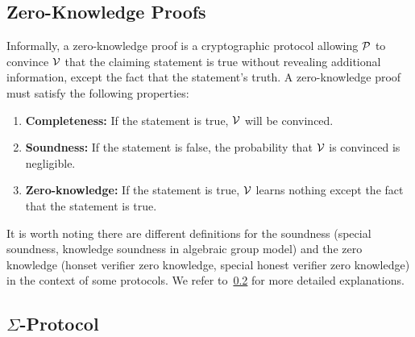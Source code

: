 \subsection{Zero-Knowledge Proofs}
Informally, a zero-knowledge proof is a cryptographic protocol allowing $\mathcal{P}$ to convince $\mathcal{V}$ that the claiming statement is true without revealing additional information, except the fact that the statement's truth. A zero-knowledge proof must satisfy the following properties:
\begin{enumerate}
    \item \textbf{Completeness:} If the statement is true, $\mathcal{V}$ will be convinced.
    \item \textbf{Soundness:} If the statement is false, the probability that $\mathcal{V}$ is convinced is negligible.
    \item \textbf{Zero-knowledge:} If the statement is true, $\mathcal{V}$ learns nothing except the fact that the statement is true.
\end{enumerate}
It is worth noting there are different definitions for the soundness (special soundness, knowledge soundness in algebraic group model) and the zero knowledge (honset verifier zero knowledge, special honest verifier zero knowledge) in the context of some protocols. We refer to~\ref{} for more detailed explanations.

\subsection{$\Sigma$-Protocol}

